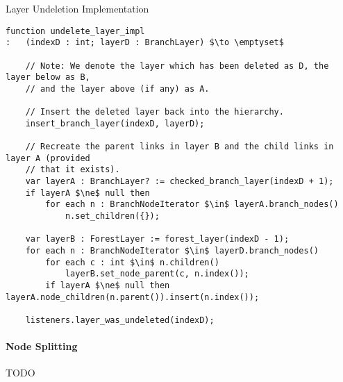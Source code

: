 \begin{stulisting}[p]
\caption{Layer Undeletion Implementation}
\label{code:ipfs-forest-undeletelayerimpl}
\begin{lstlisting}[style=Default]
function undelete_layer_impl
:	(indexD : int; layerD : BranchLayer) $\to \emptyset$

	// Note: We denote the layer which has been deleted as D, the layer below as B,
	// and the layer above (if any) as A.

	// Insert the deleted layer back into the hierarchy.
	insert_branch_layer(indexD, layerD);

	// Recreate the parent links in layer B and the child links in layer A (provided
	// that it exists).
	var layerA : BranchLayer? := checked_branch_layer(indexD + 1);
	if layerA $\ne$ null then
		for each n : BranchNodeIterator $\in$ layerA.branch_nodes()
			n.set_children({});

	var layerB : ForestLayer := forest_layer(indexD - 1);
	for each n : BranchNodeIterator $\in$ layerD.branch_nodes()
		for each c : int $\in$ n.children()
			layerB.set_node_parent(c, n.index());
		if layerA $\ne$ null then layerA.node_children(n.parent()).insert(n.index());

	listeners.layer_was_undeleted(indexD);
\end{lstlisting}
\end{stulisting}

\paragraph{Node Splitting}

TODO

